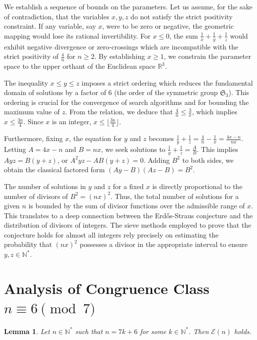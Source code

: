 \documentclass[12pt, a4paper]{article}
\newtheorem{lemma}[theorem]{Lemma}
\theoremstyle{definition}
\theoremstyle{remark}
\begin{document}
We establish a sequence of bounds on the parameters. Let us assume, for the sake of contradiction, that the variables $x, y, z$ do not satisfy the strict positivity constraint. If any variable, say $x$, were to be zero or negative, the geometric mapping would lose its rational invertibility. For $x \le 0$, the sum $\frac{1}{x} + \frac{1}{y} + \frac{1}{z}$ would exhibit negative divergence or zero-crossings which are incompatible with the strict positivity of $\frac{4}{n}$ for $n \ge 2$. By establishing $x \ge 1$, we constrain the parameter space to the upper orthant of the Euclidean space $\mathbb{R}^3$.

The inequality $x \le y \le z$ imposes a strict ordering which reduces the fundamental domain of solutions by a factor of 6 (the order of the symmetric group $\mathfrak{S}_3$). This ordering is crucial for the convergence of search algorithms and for bounding the maximum value of $z$. From the relation, we deduce that $\frac{4}{n} \le \frac{3}{x}$, which implies $x \le \frac{3n}{4}$. Since $x$ is an integer, $x \le \lfloor \frac{3n}{4} \rfloor$.

Furthermore, fixing $x$, the equation for $y$ and $z$ becomes $\frac{1}{y} + \frac{1}{z} = \frac{4}{n} - \frac{1}{x} = \frac{4x - n}{nx}$. Letting $A = 4x - n$ and $B = nx$, we seek solutions to $\frac{1}{y} + \frac{1}{z} = \frac{A}{B}$. This implies $Ayz = B(y+z)$, or $A^2 y z - AB(y+z) = 0$. Adding $B^2$ to both sides, we obtain the classical factored form $(Ay - B)(Az - B) = B^2$.

The number of solutions in $y$ and $z$ for a fixed $x$ is directly proportional to the number of divisors of $B^2 = (nx)^2$. Thus, the total number of solutions for a given $n$ is bounded by the sum of divisor functions over the admissible range of $x$. This translates to a deep connection between the Erd\H{o}s-Straus conjecture and the distribution of divisors of integers. The sieve methods employed to prove that the conjecture holds for almost all integers rely precisely on estimating the probability that $(nx)^2$ possesses a divisor in the appropriate interval to ensure $y, z \in \mathbb{N}^*$.

\section{Analysis of Congruence Class $n \equiv 6 \pmod 7$}

\begin{lemma}
Let $n \in \mathbb{N}^*$ such that $n = 7k + 6$ for some $k \in \mathbb{N}^*$. Then $\mathcal{E}(n)$ holds.
\end{lemma}
\end{document}
